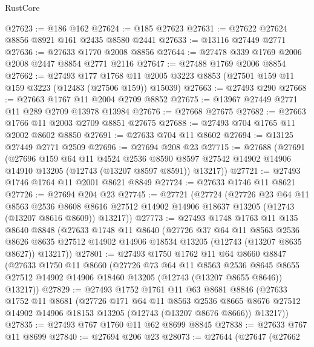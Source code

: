 \begin{lexlean}{RustCore}
\begin{coremodule}
@27623 := @186 @162
@27624 := @185 @27623
@27631 := @27622 @27624 @8856 @8921 @161 @2435 @8580 @2441
@27633 := @13116 @27449 @2771
@27636 := @27633 @1770 @2008 @8856
@27644 := @27478 @339 @1769 @2006 @2008 @2447 @8854 @2771 @2116
@27647 := @27488 @1769 @2006 @8854
@27662 := @27493
    @177
    @1768
    @11
    @2005
    @3223
    @8853
    (@27501 @159 @11 @159 @3223 (@12483 (@27506 @159)) @15039)
@27663 := @27493 @290
@27668 := @27663 @1767 @11 @2004 @2709 @8852
@27675 := @13967 @27449 @2771 @11 @289 @2709 @13978 @13984
@27676 := @27668 @27675
@27682 := @27663 @1766 @11 @2003 @2709 @8851 @27675
@27688 := @27493 @704 @1765 @11 @2002 @8602 @8850
@27691 := @27633 @704 @11 @8602
@27694 := @13125 @27449 @2771 @2509
@27696 := @27694 @208 @23
@27715 := @27688
    (@27691
      (@27696
        @159
        @64
        @11
        @4524
        @2536
        @8590
        @8597
        @27542
        @14902
        @14906
        @14910
        @13205
        (@12743 (@13207 @8597 @8591))
        @13217))
@27721 := @27493 @1746 @1764 @11 @2001 @8621 @8849
@27724 := @27633 @1746 @11 @8621
@27726 := @27694 @204 @23
@27745 := @27721
    (@27724
      (@27726
        @23
        @64
        @11
        @8563
        @2536
        @8608
        @8616
        @27512
        @14902
        @14906
        @18637
        @13205
        (@12743 (@13207 @8616 @8609))
        @13217))
@27773 := @27493
    @1748
    @1763
    @11
    @135
    @8640
    @8848
    (@27633
      @1748
      @11
      @8640
      (@27726
        @37
        @64
        @11
        @8563
        @2536
        @8626
        @8635
        @27512
        @14902
        @14906
        @18534
        @13205
        (@12743 (@13207 @8635 @8627))
        @13217))
@27801 := @27493
    @1750
    @1762
    @11
    @64
    @8660
    @8847
    (@27633
      @1750
      @11
      @8660
      (@27726
        @73
        @64
        @11
        @8563
        @2536
        @8645
        @8655
        @27512
        @14902
        @14906
        @18460
        @13205
        (@12743 (@13207 @8655 @8646))
        @13217))
@27829 := @27493
    @1752
    @1761
    @11
    @63
    @8681
    @8846
    (@27633
      @1752
      @11
      @8681
      (@27726
        @171
        @64
        @11
        @8563
        @2536
        @8665
        @8676
        @27512
        @14902
        @14906
        @18153
        @13205
        (@12743 (@13207 @8676 @8666))
        @13217))
@27835 := @27493 @767 @1760 @11 @62 @8699 @8845
@27838 := @27633 @767 @11 @8699
@27840 := @27694 @206 @23
@28073 := @27644
    (@27647
      (@27662

\end{coremodule}
\end{lexlean}
